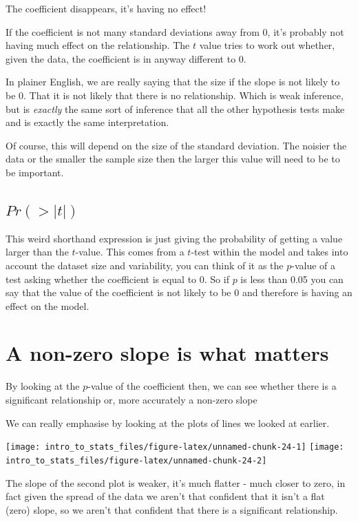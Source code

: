 \documentclass[
]{book}
\begin{document}
The coefficient disappears, it's having no effect!

If the coefficient is not many standard deviations away from 0, it's probably not having much effect on the relationship. The \(t\) value tries to work out whether, given the data, the coefficient is in anyway different to 0.

In plainer English, we are really saying that the size if the slope is not likely to be 0. That it is not likely that there is no relationship. Which is weak inference, but is \emph{exactly} the same sort of inference that all the other hypothesis tests make and is exactly the same interpretation.

Of course, this will depend on the size of the standard deviation. The noisier the data or the smaller the sample size then the larger this value will need to be to be important.

\hypertarget{prt}{%
\subsection{\texorpdfstring{\(Pr(>|t|)\)}{Pr(\textgreater\textbar t\textbar)}}\label{prt}}

This weird shorthand expression is just giving the probability of getting a value larger than the \(t\)-value. This comes from a \(t\)-test within the model and takes into account the dataset size and variability, you can think of it as the \(p\)-value of a test asking whether the coefficient is equal to 0. So if \(p\) is less than 0.05 you can say that the value of the coefficient is not likely to be 0 and therefore is having an effect on the model.

\hypertarget{a-non-zero-slope-is-what-matters}{%
\section{A non-zero slope is what matters}\label{a-non-zero-slope-is-what-matters}}

By looking at the \(p\)-value of the coefficient then, we can see whether there is a significant relationship or, more accurately a non-zero slope

We can really emphasise by looking at the plots of lines we looked at earlier.

\texttt{[image: intro\_to\_stats\_files/figure-latex/unnamed-chunk-24-1]} \texttt{[image: intro\_to\_stats\_files/figure-latex/unnamed-chunk-24-2]}

The slope of the second plot is weaker, it's much flatter - much closer to zero, in fact given the spread of the data we aren't that confident that it isn't a flat (zero) slope, so we aren't that confident that there is a significant relationship.
\end{document}
